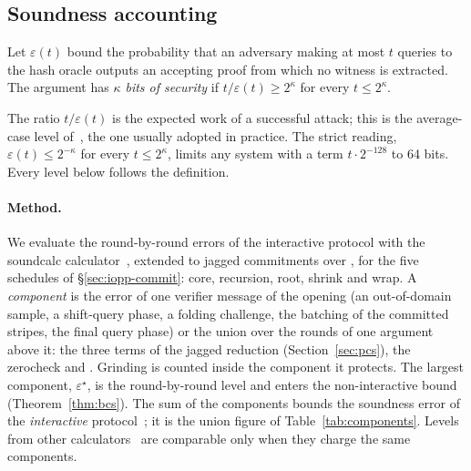 \subsection{Soundness accounting}
\label{sec:iopp-soundness}

\begin{definition}
\label{def:level}
Let $\varepsilon(t)$ bound the probability that an adversary making at most $t$ queries to the hash oracle outputs an accepting proof from which no witness is extracted. The argument has \emph{$\kappa$ bits of security} if $t/\varepsilon(t) \ge 2^{\kappa}$ for every $t \le 2^{\kappa}$.
\end{definition}

The ratio $t/\varepsilon(t)$ is the expected work of a successful attack; this is the average-case level of~\citep[\S28.2]{chiesa-yogev}, the one usually adopted in practice. The strict reading, $\varepsilon(t) \le 2^{-\kappa}$ for every $t \le 2^{\kappa}$, limits any system with a term $t \cdot 2^{-128}$ to 64 bits. Every level below follows the definition.

\paragraph{Method.} We evaluate the round-by-round errors of the interactive protocol with the soundcalc calculator~\citep{soundcalc}, extended to jagged commitments over \WHIR{}, for the five schedules of \S\ref{sec:iopp-commit}: core, recursion, root, shrink and wrap. A \emph{component} is the error of one verifier message of the opening (an out-of-domain sample, a shift-query phase, a folding challenge, the batching of the committed stripes, the final query phase) or the union over the rounds of one argument above it: the three terms of the jagged reduction (Section~\ref{sec:pcs}), the zerocheck and \LogUp{}. Grinding is counted inside the component it protects. The largest component, $\varepsilon^\star$, is the round-by-round level and enters the non-interactive bound (Theorem~\ref{thm:bcs}). The sum of the components bounds the soundness error of the \emph{interactive} protocol~\citep[Claim~31.1.3]{chiesa-yogev}; it is the union figure of Table~\ref{tab:components}. Levels from other calculators~\citep{risc0-soundness} are comparable only when they charge the same components.

